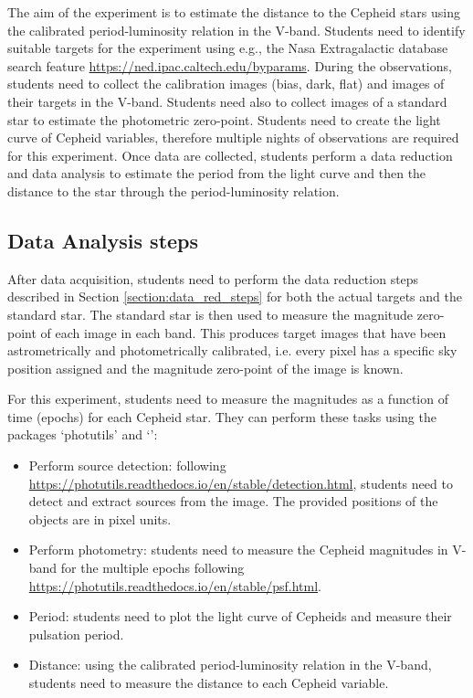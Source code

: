 \documentclass[a4paper, 11pt, fleqn]{memoir}
\begin{document}
The aim of the experiment is to estimate the distance to the Cepheid stars using the calibrated period-luminosity relation in the V-band.
Students need to identify suitable targets for the experiment using e.g., the Nasa Extragalactic database search feature \url{https://ned.ipac.caltech.edu/byparams}.
During the observations, students need to collect the calibration images (bias, dark, flat) and images of their targets in the V-band.
Students need also to collect images of a standard star to estimate the photometric zero-point.
Students need to create the light curve of Cepheid variables, therefore multiple nights of observations are required for this experiment.
Once data are collected, students perform a data reduction and data analysis to estimate the period from the light curve and then the distance to the star through the period-luminosity relation.

\subsection{Data Analysis steps}

After data acquisition, students need to perform the data reduction steps described in Section \ref{section:data_red_steps} for both the actual targets and the standard star.
The standard star is then used to measure the magnitude zero-point of each image in each band.
This produces target images that have been astrometrically and photometrically calibrated, i.e. every pixel has a specific sky position assigned and the magnitude zero-point of the image is known.

For this experiment, students need to measure the magnitudes as a function of time (epochs) for each Cepheid star.
They can perform these tasks using the  packages `photutils' and `':
\begin{itemize}
    \item Perform source detection: following \url{https://photutils.readthedocs.io/en/stable/detection.html}, students need to detect and extract sources from the image.
          The provided positions of the objects are in pixel units.
    \item
          Perform photometry: students need to measure the Cepheid magnitudes in V-band
          for the multiple epochs following
          \url{https://photutils.readthedocs.io/en/stable/psf.html}.
    \item
          Period: students need to plot the light curve of Cepheids and measure their
          pulsation period.
    \item
          Distance: using the calibrated period-luminosity relation in the V-band,
          students need to measure the distance to each Cepheid variable.
\end{itemize}
\end{document}
